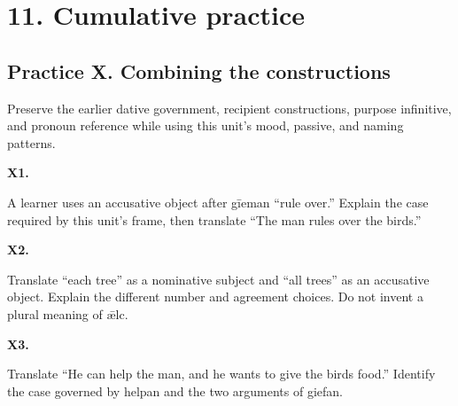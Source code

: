 \section*{11. Cumulative practice}

\subsection*{Practice X. Combining the constructions}

Preserve the earlier dative government, recipient constructions, purpose infinitive, and pronoun reference while using this unit’s mood, passive, and naming patterns.

\par\begin{minipage}{\linewidth}\raggedright
\textbf{X1.}

A learner uses an accusative object after gīeman “rule over.” Explain the case required by this unit’s frame, then translate “The man rules over the birds.”

\end{minipage}\par\addvspace{4pt}

\par\begin{minipage}{\linewidth}\raggedright
\textbf{X2.}

Translate “each tree” as a nominative subject and “all trees” as an accusative object. Explain the different number and agreement choices. Do not invent a plural meaning of ǣlc.

\end{minipage}\par\addvspace{4pt}

\par\begin{minipage}{\linewidth}\raggedright
\textbf{X3.}

Translate “He can help the man, and he wants to give the birds food.” Identify the case governed by helpan and the two arguments of giefan.

\end{minipage}\par\addvspace{4pt}

